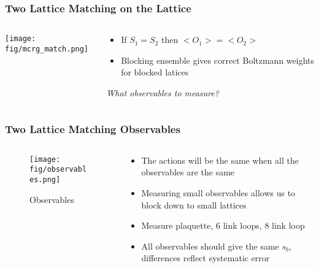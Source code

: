   \begin{frame}
    \frametitle{Two Lattice Matching on the Lattice}
    \begin{columns}[T]
      \begin{column}{.4\textwidth}
        \texttt{[image: fig/mcrg\_match.png]}
      \end{column}
      \begin{column}{.6\textwidth}
        \begin{itemize}
          \item If $S_1=S_2$ then $<O_1>=<O_2>$\\
          \item Blocking ensemble gives correct Boltzmann weights for blocked latices
        \end{itemize}
        \vspace{32pt}
      \begin{center}\emph{What observables to measure?}\end{center}
      \end{column}
    \end{columns}
  \end{frame}

  \begin{frame}
    \frametitle{Two Lattice Matching Observables}
    \begin{columns}[T]
      \begin{column}{.5\textwidth}
        \begin{figure}
          \texttt{[image: fig/observables.png]}
          \caption{Observables}
        \end{figure}
      \end{column}
      \begin{column}{.5\textwidth}
        \begin{block}{}
          \begin{itemize}
            \item The actions will be the same when all the observables are the same
            \item Measuring small observables allows us to block down to small lattices
            \item Measure plaquette, 6 link loops, 8 link loop
            \item All observables should give the same $s_b$, differences reflect systematic error
          \end{itemize}
        \end{block}
      \end{column}
    \end{columns}
  \end{frame}

